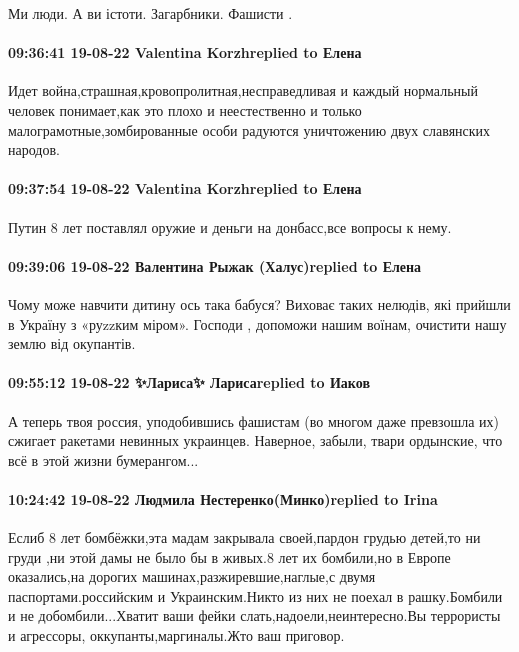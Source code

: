 Ми люди. А ви істоти. Загарбники. Фашисти .

\paragraph{09:36:41 19-08-22 Valentina Korzhreplied to Елена}

Идет война,страшная,кровопролитная,несправедливая и каждый нормальный человек
понимает,как это плохо и неестественно и только малограмотные,зомбированные
особи радуются уничтожению двух славянских народов.

\paragraph{09:37:54 19-08-22 Valentina Korzhreplied to Елена}

Путин 8 лет поставлял оружие и деньги на донбасс,все вопросы к нему.

\paragraph{09:39:06 19-08-22 Валентина Рыжак (Халус)replied to Елена}

Чому може навчити дитину ось така бабуся? Виховає таких нелюдів, які прийшли в
Україну з «руzzким міром». Господи , допоможи нашим воїнам, очистити нашу землю
від окупантів.

\paragraph{09:55:12 19-08-22 ✨Лариса✨ Ларисаreplied to Иаков}

А теперь твоя россия, уподобившись фашистам (во многом даже превзошла их)
сжигает ракетами невинных украинцев. Наверное, забыли, твари ордынские, что всё
в этой жизни бумерангом...

\paragraph{10:24:42 19-08-22 Людмила Нестеренко(Минко)replied to Irina}

Еслиб 8 лет бомбёжки,эта мадам закрывала своей,пардон грудью детей,то ни груди
,ни этой дамы не было бы в живых.8 лет их бомбили,но в Европе оказались,на
дорогих машинах,разжиревшие,наглые,с двумя паспортами.российским и
Украинским.Никто из них не поехал в рашку.Бомбили и не добомбили...Хватит ваши
фейки слать,надоели,неинтересно.Вы террористы и агрессоры,
оккупанты,маргиналы.Жто ваш приговор.

